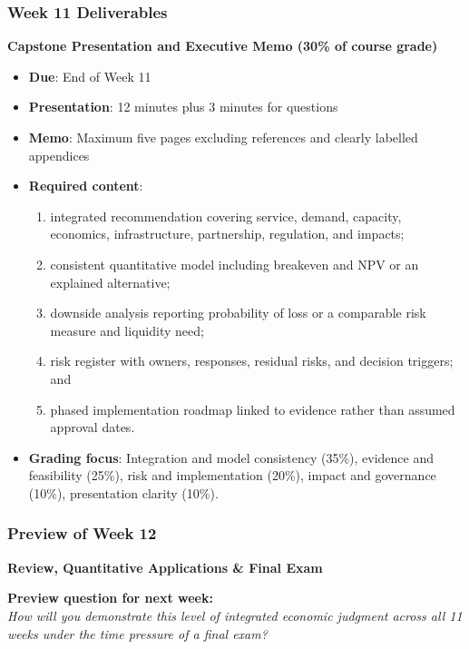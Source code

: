 \documentclass{beamer}
\begin{document}
\begin{frame}[t]
\frametitle{Week 11 Deliverables}
\textbf{Capstone Presentation and Executive Memo (30\% of course grade)}
\begin{itemize}
\item \textbf{Due}: End of Week 11
\item \textbf{Presentation}: 12 minutes plus 3 minutes for questions
\item \textbf{Memo}: Maximum five pages excluding references and clearly labelled appendices
\item \textbf{Required content}:
\begin{enumerate}
\item integrated recommendation covering service, demand, capacity, economics, infrastructure, partnership, regulation, and impacts;
\item consistent quantitative model including breakeven and NPV or an explained alternative;
\item downside analysis reporting probability of loss or a comparable risk measure and liquidity need;
\item risk register with owners, responses, residual risks, and decision triggers; and
\item phased implementation roadmap linked to evidence rather than assumed approval dates.
\end{enumerate}
\item \textbf{Grading focus}: Integration and model consistency (35\%), evidence and feasibility (25\%), risk and implementation (20\%), impact and governance (10\%), presentation clarity (10\%).
\end{itemize}
\end{frame}

\begin{frame}[t]
  \frametitle{Preview of Week 12}
  
  \begin{center}
      \Large \textbf{Review, Quantitative Applications \& Final Exam}
  \end{center}
  
  \vspace{1cm}
  \textbf{Preview question for next week:} \\
  \textit{How will you demonstrate this level of integrated economic judgment across all 11 weeks under the time pressure of a final exam?}
\end{frame}
\end{document}
